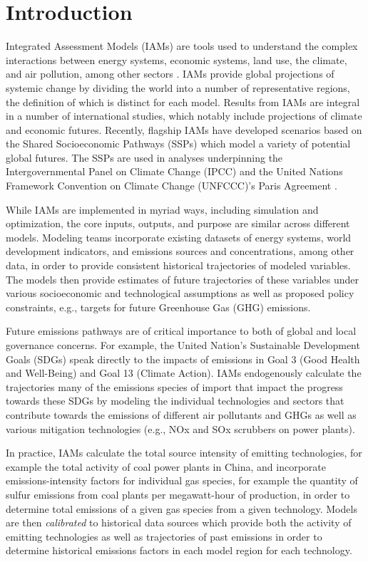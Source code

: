 \section{Introduction}

Integrated Assessment Models (IAMs) are tools used to understand the complex
interactions between energy systems, economic systems, land use, the climate,
and air pollution, among other sectors . IAMs provide global projections of
systemic change by dividing the world into a number of representative regions,
the definition of which is distinct for each model. Results from IAMs are
integral in a number of international studies, which notably include projections
of climate and economic futures. Recently, flagship IAMs have developed
scenarios based on the Shared Socioeconomic Pathways (SSPs)
\cite{van_vuuren_energy_2017, kriegler_fossil-fueled_2017, calvin_ssp4:_2017,
  fujimori_ssp3:_2017, fricko_marker_2017} which model a variety of potential
global futures. The SSPs are used in analyses underpinning the Intergovernmental
Panel on Climate Change (IPCC) and the United Nations Framework Convention on
Climate Change (UNFCCC)'s Paris Agreement .

While IAMs are implemented in myriad ways, including simulation and
optimization, the core inputs, outputs, and purpose are similar across different
models. Modeling teams incorporate existing datasets of energy systems, world
development indicators, and emissions sources and concentrations, among other
data, in order to provide consistent historical trajectories of modeled
variables. The models then provide estimates of future trajectories of these
variables under various socioeconomic and technological assumptions as well as
proposed policy constraints, e.g., targets for future Greenhouse Gas (GHG)
emissions.

Future emissions pathways are of critical importance to both of global and local
governance concerns. For example, the United Nation's Sustainable Development
Goals (SDGs)  speak directly to the impacts of emissions in Goal 3
(Good Health and Well-Being) and Goal 13 (Climate Action). IAMs endogenously
calculate the trajectories many of the emissions species of import that impact
the progress towards these SDGs by modeling the individual technologies and
sectors that contribute towards the emissions of different air pollutants and
GHGs as well as various mitigation technologies (e.g., NOx and SOx scrubbers on
power plants).

In practice, IAMs calculate the total source intensity of emitting technologies,
for example the total activity of coal power plants in China, and incorporate
emissions-intensity factors for individual gas species, for example the quantity
of sulfur emissions from coal plants per megawatt-hour of production, in order
to determine total emissions of a given gas species from a given
technology. Models are then \textit{calibrated} to historical data sources which
provide both the activity of emitting technologies as well as trajectories of
past emissions in order to determine historical emissions factors in each model
region for each technology.

